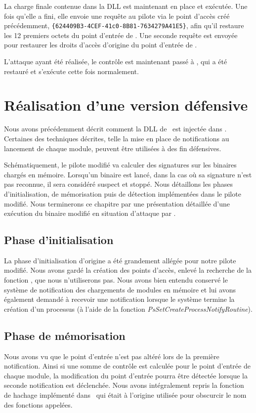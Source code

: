 La charge finale contenue dans la DLL est maintenant en place et exécutée.
Une fois qu'elle a fini, elle envoie une requête au pilote via le point d'accès créé précédemment, \texttt{\{624409B3-4CEF-41c0-8B81-7634279A41E5\}}, afin qu'il restaure les 12 premiers octets du point d'entrée de \services.
Une seconde requête est envoyée pour restaurer les droits d'accès d'origine du point d'entrée de \services.

L'attaque ayant été réalisée, le contrôle est maintenant passé à \services, qui a été restauré et s'exécute cette fois normalement.

\section{Réalisation d'une version défensive}
Nous avons précédemment décrit comment la DLL de \duqu\ est injectée dans \services.
Certaines des techniques décrites, telle la mise en place de notifications au lancement de chaque module, peuvent être utilisées à des fin défensives.

Schématiquement, le pilote modifié va calculer des signatures sur les binaires chargés en mémoire.
Lorsqu'un binaire est lancé, dans la cas où sa signature n'est pas reconnue, il sera considéré suspect et stoppé.
Nous détaillons les phases d'initialisation, de mémorisation puis de détection implémentées dans le pilote modifié.
Nous terminerons ce chapitre par une présentation détaillée d'une exécution du binaire modifié en situation d'attaque par \duqu.

\subsection{Phase d'initialisation}
La phase d'initialisation d'origine a été grandement allégée pour notre pilote modifié.
Nous avons gardé la création des points d'accès, enlevé la recherche de la fonction \ZwP, que nous n'utiliserons pas.
Nous avons bien entendu conservé le système de notification des chargements de modules en mémoire et lui avons également demandé à recevoir une notification lorsque le système termine la création d'un processus (à l'aide de la fonction \emph{PsSetCreateProcessNotifyRoutine}).

\subsection{Phase de mémorisation}
Nous avons vu que le point d'entrée n'est pas altéré lors de la première notification.
Ainsi si une somme de contrôle est calculée pour le point d'entrée de chaque module, la modification du point d'entrée pourra être détectée lorsque la seconde notification est déclenchée.
Nous avons intégralement repris la fonction de hachage implémenté dans \duqu\ qui était à l'origine utilisée pour obscurcir le nom des fonctions appelées.

